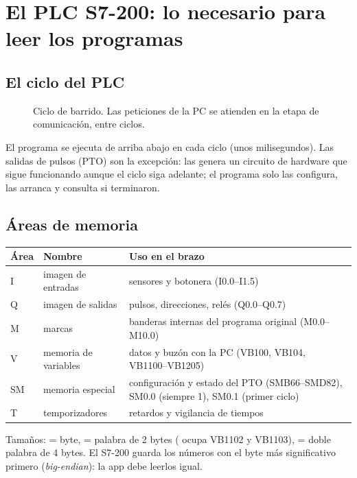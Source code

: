 \chapter{El PLC S7-200: lo necesario para leer los programas}\label{cap:s7200}

\section{El ciclo del PLC}
\begin{figure}[H]
\centering
{}
\caption{Ciclo de barrido. Las peticiones de la PC se atienden en la etapa de comunicación, entre ciclos.}
\end{figure}
El programa se ejecuta de arriba abajo en cada ciclo (unos milisegundos). Las salidas de pulsos (PTO) son la excepción: las genera un circuito de hardware que sigue funcionando aunque el ciclo siga adelante; el programa solo las configura, las arranca y consulta si terminaron.

\section{Áreas de memoria}
\begin{center}\small
\begin{tabularx}{\linewidth}{>{\ttfamily}p{1.4cm} >{\raggedright}p{3.6cm} >{\raggedright\arraybackslash}X}
\toprule
\textbf{\rmfamily Área} & \textbf{Nombre} & \textbf{Uso en el brazo}\\
\midrule
I & imagen de entradas & sensores y botonera (I0.0--I1.5)\\
Q & imagen de salidas & pulsos, direcciones, relés (Q0.0--Q0.7)\\
M & marcas & banderas internas del programa original (M0.0--M10.0)\\
V & memoria de variables & datos y buzón con la PC (VB100, VB104, VB1100--VB1205)\\
SM & memoria especial & configuración y estado del PTO (SMB66--SMD82), SM0.0 (siempre 1), SM0.1 (primer ciclo)\\
T & temporizadores & retardos y vigilancia de tiempos\\
\bottomrule
\end{tabularx}
\end{center}
Tamaños:  = byte,  = palabra de 2 bytes ( ocupa VB1102 y VB1103),  = doble palabra de 4 bytes. El S7-200 guarda los números con el byte más significativo primero (\emph{big-endian}): la app debe leerlos igual.

